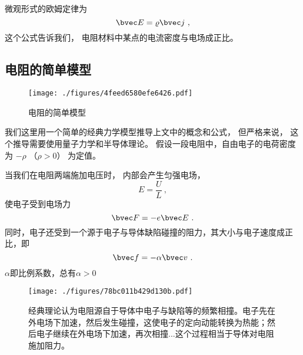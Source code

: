 微观形式的欧姆定律为
\begin{equation}
\bvec E = \varrho\bvec j~,
\end{equation}
这个公式告诉我们， 电阻材料中某点的电流密度与电场成正比。

\subsection{电阻的简单模型}
\begin{figure}[ht]
\centering
\texttt{[image: ./figures/4feed6580efe6426.pdf]}
\caption{电阻的简单模型} \label{fig_Resist_1}
\end{figure}

我们这里用一个简单的经典力学模型推导上文中的概念和公式， 但严格来说， 这个推导需要使用量子力学和半导体理论。 假设一段电阻中，自由电子的电荷密度为 $-\rho$ （$\rho > 0$） 为定值。

当我们在电阻两端施加电压时， 内部会产生匀强电场，
\begin{equation}\label{eq_Resist_6}
E = \frac UL~,
\end{equation}
使电子受到电场力
\begin{equation}
\bvec F = -e\bvec E~.
\end{equation}
同时，电子还受到一个源于电子与导体缺陷碰撞的阻力，其大小与电子速度成正比，即
\begin{equation}
\bvec f = -\alpha \bvec v~.
\end{equation}
$\alpha$即比例系数，总有$\alpha>0$

\begin{figure}[ht]
\centering
\texttt{[image: ./figures/78bc011b429d130b.pdf]}
\caption{经典理论认为电阻源自于导体中电子与缺陷等的频繁相撞。电子先在外电场下加速，然后发生碰撞，这使电子的定向动能转换为热能；然后电子继续在外电场下加速，再次相撞...这个过程相当于导体对电阻施加阻力。} \label{fig_Resist_4}
\end{figure}

